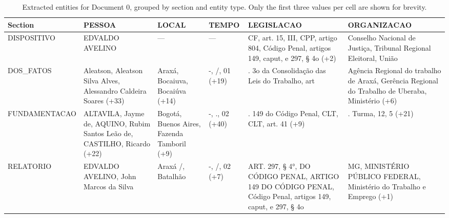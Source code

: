 \begin{table}[t]
\centering
\caption{Extracted entities for Document 0, grouped by section and entity type. Only the first three values per cell are shown for brevity.}
\label{tab:extraction_example}
\small
\begin{tabularx}{\textwidth}{lXXXXX}
\toprule
Section & PESSOA & LOCAL & TEMPO & LEGISLACAO & ORGANIZACAO \\
\midrule
DISPOSITIVO & EDVALDO AVELINO & --- & --- & CF, art. 15, III, CPP, artigo 804, Código Penal, artigos 149, caput, e 297, § 4o (+2) & Conselho Nacional de Justiça, Tribunal Regional Eleitoral, União \\
DOS\_FATOS & Aleatson, Aleatson Silva Alves, Alessandro Caldeira Soares (+33) & Araxá, Bocaiuva, Bocaiúva (+14) & -, /, 01 (+19) & . 3o da Consolidação das Leis do Trabalho, art & Agência Regional do trabalho de Araxá, Gerência Regional do Trabalho de Uberaba, Ministério (+6) \\
FUNDAMENTACAO & ALTAVILA, Jayme de, AQUINO, Rubim Santos Leão de, CASTILHO, Ricardo (+22) & Bogotá, Buenos Aires, Fazenda Tamboril (+9) & -, ., 02 (+40) & . 149 do Código Penal, CLT, CLT, art. 41 (+9) & . Turma, 12, 5 (+21) \\
RELATORIO & EDVALDO AVELINO, John Marcos da Silva & Araxá /, Batalhão & -, /, 02 (+7) & ART. 297, § 4°, DO CÓDIGO PENAL, ARTIGO 149 DO CÓDIGO PENAL, Código Penal, artigos 149, caput, e 297, § 4o & MG, MINISTÉRIO PÚBLICO FEDERAL, Ministério do Trabalho e Emprego (+1) \\
\bottomrule
\end{tabularx}
\end{table}